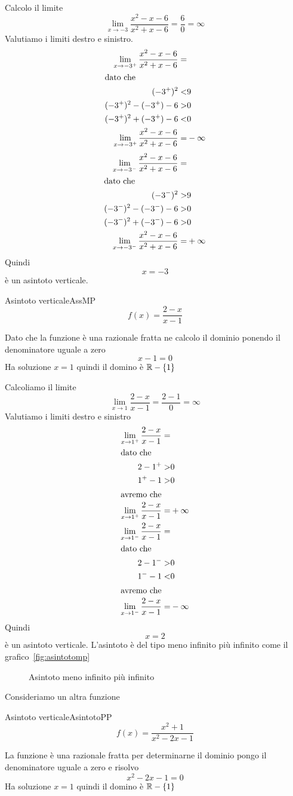Calcolo il limite \[\lim_{x\to -3}\dfrac{x^2-x-6}{x^2+x-6}=\dfrac{6}{0}=\infty\] Valutiamo i limiti destro e sinistro. 
\begin{align*}
\lim_{x\to -3^+}\dfrac{x^2-x-6}{x^2+x-6}=&\\
\intertext{dato che}
(-3^+)^2<&9\\
(-3^+)^2-(-3^+)-6>&0\\
(-3^+)^2+(-3^+)-6<&0\\
\lim_{x\to -3^+}\dfrac{x^2-x-6}{x^2+x-6}=&-\infty\\
\end{align*}
\begin{align*}
\lim_{x\to -3^-}\dfrac{x^2-x-6}{x^2+x-6}=&\\
\intertext{dato che}
(-3^-)^2>&9\\
(-3^-)^2-(-3^-)-6>&0\\
(-3^-)^2+(-3^-)-6>&0\\
\lim_{x\to -3^-}\dfrac{x^2-x-6}{x^2+x-6}=&+\infty\\
\end{align*}
Quindi \[x=-3\] è un asintoto verticale.
\begin{esempiot}{Asintoto verticale}{AssMP}
	\[f(x)=\dfrac{2-x}{x-1}\]
\end{esempiot}
Dato che la funzione è una razionale fratta ne calcolo il dominio ponendo il denominatore uguale a zero\[x-1=0\]Ha soluzione $x=1$ quindi il domino è $\mathbb{R}-\lbrace1\rbrace$

Calcoliamo il limite\[\lim_{x\to 1}\dfrac{2-x}{x-1}=\dfrac{2-1}{0}=\infty\]
Valutiamo i limiti destro e sinistro
\begin{align*}
\lim_{x\to 1^+}\dfrac{2-x}{x-1}=&\\
\intertext{dato che}
2-1^+>&0\\
1^+-1>&0\\
\intertext{avremo che}
\lim_{x\to 1^+}\dfrac{2-x}{x-1}=&+\infty\\
\lim_{x\to 1^-}\dfrac{2-x}{x-1}=&\\
\intertext{dato che}
2-1^->&0\\
1^--1<&0\\
\intertext{avremo che}
\lim_{x\to 1^-}\dfrac{2-x}{x-1}=&-\infty\\
\end{align*}
Quindi \[x=2\] è un asintoto verticale.
L'asintoto è del tipo meno infinito più infinito come il grafico~\vref{fig:asintotomp}
\begin{figure}
	\centering
	
	\captionsetup{format=grafico}
	\caption[Asintoto meno infinito più infinito]{Asintoto meno infinito più infinito}
	\label{fig:asintotomp}
\end{figure}
Consideriamo un altra  funzione
\begin{esempiot}{Asintoto verticale}{AsintotoPP}
	\[f(x)=\dfrac{x^2+1}{x^2-2x-1} \]
\end{esempiot}
La funzione è una razionale fratta per determinarne il dominio pongo il denominatore uguale a zero e risolvo
\[x^2-2x-1=0\]Ha soluzione $x=1$ quindi il domino è $\mathbb{R}-\lbrace1\rbrace$


